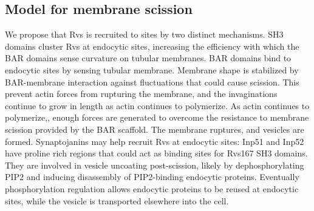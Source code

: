 \documentclass[9pt,lineno]{elife}
\begin{document}
\subsection{Model for membrane scission}
We propose that Rvs is recruited to sites by two distinct mechanisms. SH3 domains cluster Rvs at endocytic sites, increasing the efficiency with which the BAR domains sense curvature on tubular membranes. BAR domains bind to endocytic sites by sensing tubular membrane. Membrane shape is stabilized by BAR-membrane interaction against fluctuations that could cause scission. This prevent actin forces from rupturing the membrane, and the invaginations continue to grow in length as actin continues to polymerize. As actin continues to polymerize,, enough forces are generated to overcome the resistance to membrane scission provided by the BAR scaffold. The membrane ruptures, and vesicles are formed. Synaptojanins may help recruit Rvs at endocytic sites: Inp51 and Inp52 have proline rich regions that could act as binding sites for Rvs167 SH3 domains. They are involved in vesicle uncoating post-scission, likely by dephosphorylating PIP2 and inducing disassembly of PIP2-binding endocytic proteins. Eventually phosphorylation regulation allows endocytic proteins to be reused at endocytic sites, while the vesicle is transported elsewhere into the cell. 


\end{document}
